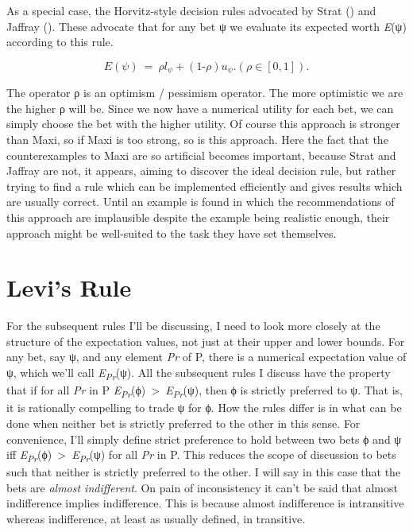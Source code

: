 \documentclass[
  10pt,
  letterpaper,
  DIV=11,
  numbers=noendperiod,
  twoside]{scrartcl}
\begin{document}
As a special case, the Horvitz-style decision rules advocated by Strat
() and Jaffray
(). These advocate that for any bet ψ we
evaluate its expected worth \emph{E}(ψ) according to this rule.

\[
E(\psi)~=~\rho l_\psi + (1‑ \rho)u_\psi. (\rho \in [0, 1]).
\]

The operator ρ is an optimism / pessimism operator. The more optimistic
we are the higher ρ will be. Since we now have a numerical utility for
each bet, we can simply choose the bet with the higher utility. Of
course this approach is stronger than Maxi, so if Maxi is too strong, so
is this approach. Here the fact that the counterexamples to Maxi are so
artificial becomes important, because Strat and Jaffray are not, it
appears, aiming to discover the ideal decision rule, but rather trying
to find a rule which can be implemented efficiently and gives results
which are usually correct. Until an example is found in which the
recommendations of this approach are implausible despite the example
being realistic enough, their approach might be well-suited to the task
they have set themselves.

\section{Levi's Rule}\label{levis-rule}

For the subsequent rules I'll be discussing, I need to look more closely
at the structure of the expectation values, not just at their upper and
lower bounds. For any bet, say ψ, and any element \emph{Pr} of P, there
is a numerical expectation value of ψ, which we'll call
\emph{E\textsubscript{Pr}}(ψ). All the subsequent rules I discuss have
the property that if for all \emph{Pr} in P
\emph{E\textsubscript{Pr}}(ϕ)~\textgreater~\emph{E\textsubscript{Pr}}(ψ),
then ϕ is strictly preferred to ψ. That is, it is rationally compelling
to trade ψ for ϕ. How the rules differ is in what can be done when
neither bet is strictly preferred to the other in this sense. For
convenience, I'll simply define strict preference to hold between two
bets ϕ and ψ iff
\emph{E\textsubscript{Pr}}(ϕ)~\textgreater~\emph{E\textsubscript{Pr}}(ψ)
for all \emph{Pr} in P. This reduces the scope of discussion to bets
such that neither is strictly preferred to the other. I will say in this
case that the bets are \emph{almost indifferent}. On pain of
inconsistency it can't be said that almost indifference implies
indifference. This is because almost indifference is intransitive
whereas indifference, at least as usually defined, in transitive.
\end{document}
